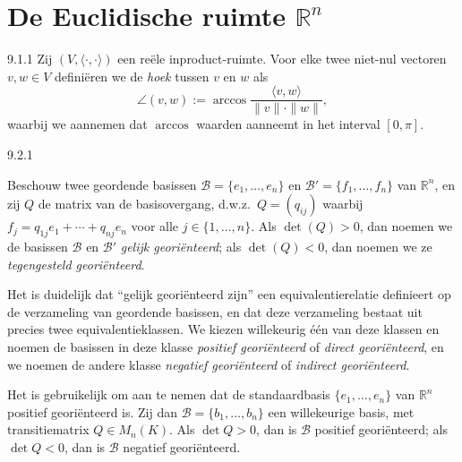 \section{De Euclidische ruimte $\mathbb R^n$}

\begin{res}{9.1.1}
Zij $(V,\langle\cdot,\cdot\rangle)$ een re\"ele inproduct-ruimte. Voor elke twee niet-nul vectoren $v,w\in V$ defini\"eren we de \textit{hoek} tussen $v$ en $w$ als
\[
\angle(v,w):=\arccos\frac{\langle v,w\rangle}{\|v\|\cdot\|w\|},
\]
waarbij we aannemen dat $\arccos$ waarden aanneemt in het interval $[0,\pi]$.
\end{res}

\begin{res}{9.2.1}
\begin{myenum}
\item Beschouw twee geordende basissen $\mathcal B=\{e_1,\dots,e_n\}$ en $\mathcal B'=\{f_1,\dots,f_n\}$ van $\mathbb R^n$, en zij $Q$ de matrix van de basisovergang, d.w.z.\ $Q=(q_{ij})$ waarbij $f_j=q_{1j}e_1+\cdots+q_{nj}e_n$ voor alle $j\in\{1,\dots,n\}$. Als $\det(Q)>0$, dan noemen we de basissen $\mathcal B$ en $\mathcal B'$ \textit{gelijk geori\"enteerd}; als $\det(Q)<0$, dan noemen we ze \textit{tegengesteld geori\"enteerd}.
\item Het is duidelijk dat ``gelijk geori\"enteerd zijn'' een equivalentierelatie definieert op de verzameling van geordende basissen, en dat deze verzameling bestaat uit precies twee equivalentieklassen. We kiezen willekeurig \'e\'en van deze klassen en noemen de basissen in deze klasse \textit{positief geori\"enteerd} of \textit{direct geori\"enteerd}, en we noemen de andere klasse \textit{negatief geori\"enteerd} of \textit{indirect geori\"enteerd}.
\item Het is gebruikelijk om aan te nemen dat de standaardbasis $\{e_1,\dots,e_n\}$ van $\mathbb R^n$ positief geori\"enteerd is. Zij dan $\mathcal B=\{b_1,\dots,b_n\}$ een willekeurige basis, met transitiematrix $Q\in M_n(K)$. Als $\det Q>0$, dan is $\mathcal B$ positief geori\"enteerd; als $\det Q<0$, dan is $\mathcal B$ negatief geori\"enteerd.
\end{myenum}
\end{res}


